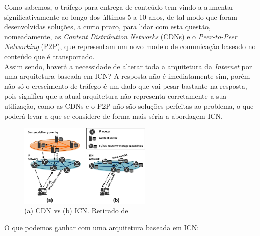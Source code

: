 \documentclass[conference]{IEEEtran}
\begin{document}
Como sabemos, o tr\'{a}fego para entrega de conte\'{u}do tem vindo a aumentar significativamente ao longo dos \'{u}ltimos 5 a 10 anos, de tal modo que foram desenvolvidas solu\c{c}\~{o}es, a curto prazo, para lidar com esta quest\~{a}o, nomeadamente, as \textit{Content Distribution Networks} (CDNs)\cite{cdn} e o \textit{Peer-to-Peer Networking} (P2P)\cite{p2p}, que representam um novo modelo de comunica\c{c}\~{a}o baseado no conte\'{u}do que \'{e} transportado.\\

Assim sendo, haver\'{a} a necessidade de alterar toda a arquitetura da \textit{Internet} por uma arquitetura baseada em ICN? A resposta n\~{a}o \'{e} imediatamente sim, por\'{e}m n\~{a}o s\'{o} o crescimento de tr\'{a}fego \'{e} um dado que vai pesar bastante na resposta, pois significa que a atual arquitetura n\~{a}o representa corretamente a sua utiliza\c{c}\~{a}o, como as CDNs e o P2P n\~{a}o s\~{a}o solu\c{c}\~{o}es perfeitas ao problema, o que poder\'{a} levar a que se considere de forma mais s\'{e}ria a abordagem ICN.\\ 


\begin{figure}[h]
\centering
\includegraphics[width=2.5in]{cdnvsicn}
\caption{(a) CDN vs (b) ICN. Retirado de \cite{cdnToICN}}
\label{cdnvsicn}
\end{figure}

O que podemos ganhar com uma arquitetura baseada em ICN\cite{ahlgren}:\\
\end{document}
